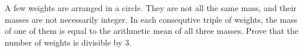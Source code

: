 \problem
A few weights are arranged in a circle.
They are not all the same mass, and their masses are not necessarily integer.
In each consequtive triple of weights, the mass of one of them is equal to the
arithmetic mean of all three masses.
Prove that the number of weights is divisible by 3.
\solution
\endproblem
